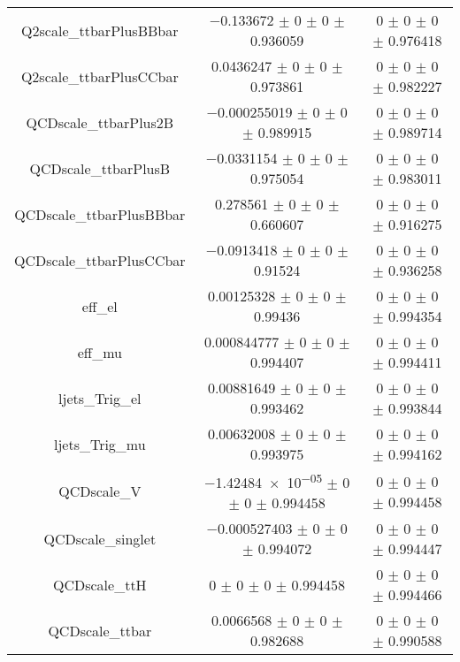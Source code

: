 \begin{table}
\begin{tabular}{ccc}
Q2scale\_ttbarPlusBBbar & \num{-0.133672} $\pm$ \num{0} $\pm$ \num{0} $\pm$ \num{0.936059} & \num{0} $\pm$ \num{0} $\pm$ \num{0} $\pm$ \num{0.976418}\\
Q2scale\_ttbarPlusCCbar & \num{0.0436247} $\pm$ \num{0} $\pm$ \num{0} $\pm$ \num{0.973861} & \num{0} $\pm$ \num{0} $\pm$ \num{0} $\pm$ \num{0.982227}\\
QCDscale\_ttbarPlus2B & \num{-0.000255019} $\pm$ \num{0} $\pm$ \num{0} $\pm$ \num{0.989915} & \num{0} $\pm$ \num{0} $\pm$ \num{0} $\pm$ \num{0.989714}\\
QCDscale\_ttbarPlusB & \num{-0.0331154} $\pm$ \num{0} $\pm$ \num{0} $\pm$ \num{0.975054} & \num{0} $\pm$ \num{0} $\pm$ \num{0} $\pm$ \num{0.983011}\\
QCDscale\_ttbarPlusBBbar & \num{0.278561} $\pm$ \num{0} $\pm$ \num{0} $\pm$ \num{0.660607} & \num{0} $\pm$ \num{0} $\pm$ \num{0} $\pm$ \num{0.916275}\\
QCDscale\_ttbarPlusCCbar & \num{-0.0913418} $\pm$ \num{0} $\pm$ \num{0} $\pm$ \num{0.91524} & \num{0} $\pm$ \num{0} $\pm$ \num{0} $\pm$ \num{0.936258}\\
eff\_el & \num{0.00125328} $\pm$ \num{0} $\pm$ \num{0} $\pm$ \num{0.99436} & \num{0} $\pm$ \num{0} $\pm$ \num{0} $\pm$ \num{0.994354}\\
eff\_mu & \num{0.000844777} $\pm$ \num{0} $\pm$ \num{0} $\pm$ \num{0.994407} & \num{0} $\pm$ \num{0} $\pm$ \num{0} $\pm$ \num{0.994411}\\
ljets\_Trig\_el & \num{0.00881649} $\pm$ \num{0} $\pm$ \num{0} $\pm$ \num{0.993462} & \num{0} $\pm$ \num{0} $\pm$ \num{0} $\pm$ \num{0.993844}\\
ljets\_Trig\_mu & \num{0.00632008} $\pm$ \num{0} $\pm$ \num{0} $\pm$ \num{0.993975} & \num{0} $\pm$ \num{0} $\pm$ \num{0} $\pm$ \num{0.994162}\\
QCDscale\_V & \num{-1.42484e-05} $\pm$ \num{0} $\pm$ \num{0} $\pm$ \num{0.994458} & \num{0} $\pm$ \num{0} $\pm$ \num{0} $\pm$ \num{0.994458}\\
QCDscale\_singlet & \num{-0.000527403} $\pm$ \num{0} $\pm$ \num{0} $\pm$ \num{0.994072} & \num{0} $\pm$ \num{0} $\pm$ \num{0} $\pm$ \num{0.994447}\\
QCDscale\_ttH & \num{0} $\pm$ \num{0} $\pm$ \num{0} $\pm$ \num{0.994458} & \num{0} $\pm$ \num{0} $\pm$ \num{0} $\pm$ \num{0.994466}\\
QCDscale\_ttbar & \num{0.0066568} $\pm$ \num{0} $\pm$ \num{0} $\pm$ \num{0.982688} & \num{0} $\pm$ \num{0} $\pm$ \num{0} $\pm$ \num{0.990588}\\

\end{tabular}
\end{table}
